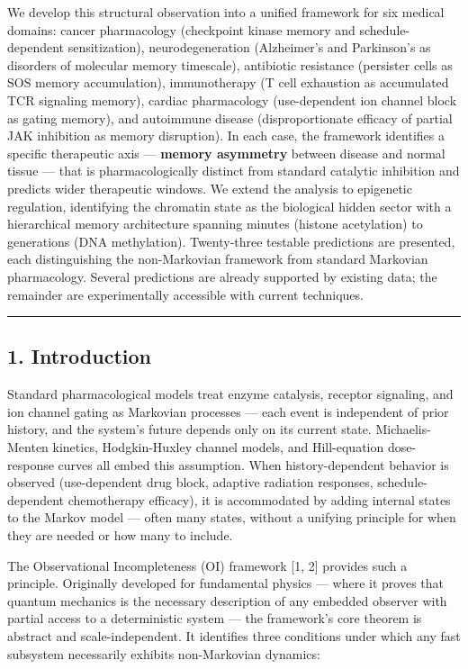 \documentclass[
  11pt,
]{article}
\begin{document}
We develop this structural observation into a unified framework for six
medical domains: cancer pharmacology (checkpoint kinase memory and
schedule-dependent sensitization), neurodegeneration (Alzheimer's and
Parkinson's as disorders of molecular memory timescale), antibiotic
resistance (persister cells as SOS memory accumulation), immunotherapy
(T cell exhaustion as accumulated TCR signaling memory), cardiac
pharmacology (use-dependent ion channel block as gating memory), and
autoimmune disease (disproportionate efficacy of partial JAK inhibition
as memory disruption). In each case, the framework identifies a specific
therapeutic axis --- \textbf{memory asymmetry} between disease and
normal tissue --- that is pharmacologically distinct from standard
catalytic inhibition and predicts wider therapeutic windows. We extend
the analysis to epigenetic regulation, identifying the chromatin state
as the biological hidden sector with a hierarchical memory architecture
spanning minutes (histone acetylation) to generations (DNA methylation).
Twenty-three testable predictions are presented, each distinguishing the
non-Markovian framework from standard Markovian pharmacology. Several
predictions are already supported by existing data; the remainder are
experimentally accessible with current techniques.

\begin{center}\rule{0.5\linewidth}{0.5pt}\end{center}

\hypertarget{introduction}{%
\subsection{1. Introduction}\label{introduction}}

Standard pharmacological models treat enzyme catalysis, receptor
signaling, and ion channel gating as Markovian processes --- each event
is independent of prior history, and the system's future depends only on
its current state. Michaelis-Menten kinetics, Hodgkin-Huxley channel
models, and Hill-equation dose-response curves all embed this
assumption. When history-dependent behavior is observed (use-dependent
drug block, adaptive radiation responses, schedule-dependent
chemotherapy efficacy), it is accommodated by adding internal states to
the Markov model --- often many states, without a unifying principle for
when they are needed or how many to include.

The Observational Incompleteness (OI) framework {[}1, 2{]} provides such
a principle. Originally developed for fundamental physics --- where it
proves that quantum mechanics is the necessary description of any
embedded observer with partial access to a deterministic system --- the
framework's core theorem is abstract and scale-independent. It
identifies three conditions under which any fast subsystem necessarily
exhibits non-Markovian dynamics:
\end{document}
